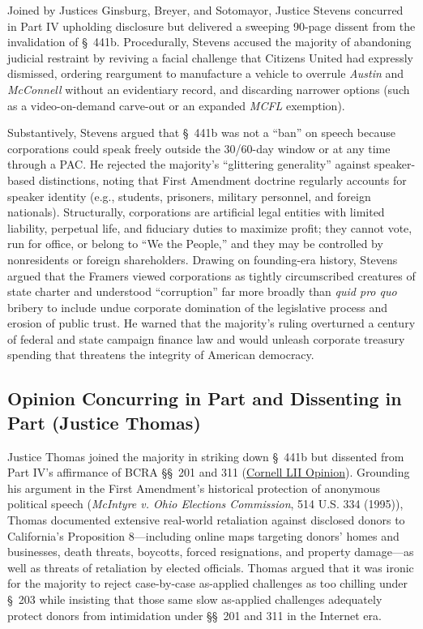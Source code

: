 \documentclass[12pt]{article}
\begin{document}
Joined by Justices Ginsburg, Breyer, and Sotomayor, Justice Stevens concurred in Part IV upholding disclosure but delivered a sweeping 90-page dissent from the invalidation of \S~441b. Procedurally, Stevens accused the majority of abandoning judicial restraint by reviving a facial challenge that Citizens United had expressly dismissed, ordering reargument to manufacture a vehicle to overrule \textit{Austin} and \textit{McConnell} without an evidentiary record, and discarding narrower options (such as a video-on-demand carve-out or an expanded \textit{MCFL} exemption).

Substantively, Stevens argued that \S~441b was not a ``ban'' on speech because corporations could speak freely outside the 30/60-day window or at any time through a PAC. He rejected the majority's ``glittering generality'' against speaker-based distinctions, noting that First Amendment doctrine regularly accounts for speaker identity (e.g., students, prisoners, military personnel, and foreign nationals). Structurally, corporations are artificial legal entities with limited liability, perpetual life, and fiduciary duties to maximize profit; they cannot vote, run for office, or belong to ``We the People,'' and they may be controlled by nonresidents or foreign shareholders. Drawing on founding-era history, Stevens argued that the Framers viewed corporations as tightly circumscribed creatures of state charter and understood ``corruption'' far more broadly than \textit{quid pro quo} bribery to include undue corporate domination of the legislative process and erosion of public trust. He warned that the majority's ruling overturned a century of federal and state campaign finance law and would unleash corporate treasury spending that threatens the integrity of American democracy.

\subsection{Opinion Concurring in Part and Dissenting in Part (Justice Thomas)}

Justice Thomas joined the majority in striking down \S~441b but dissented from Part IV's affirmance of BCRA \S\S~201 and 311 (\href{https://www.law.cornell.edu/supct/html/08-205.ZX1.html}{Cornell LII Opinion}). Grounding his argument in the First Amendment's historical protection of anonymous political speech (\textit{McIntyre v. Ohio Elections Commission}, 514 U.S. 334 (1995)), Thomas documented extensive real-world retaliation against disclosed donors to California's Proposition 8---including online maps targeting donors' homes and businesses, death threats, boycotts, forced resignations, and property damage---as well as threats of retaliation by elected officials. Thomas argued that it was ironic for the majority to reject case-by-case as-applied challenges as too chilling under \S~203 while insisting that those same slow as-applied challenges adequately protect donors from intimidation under \S\S~201 and 311 in the Internet era.
\end{document}

